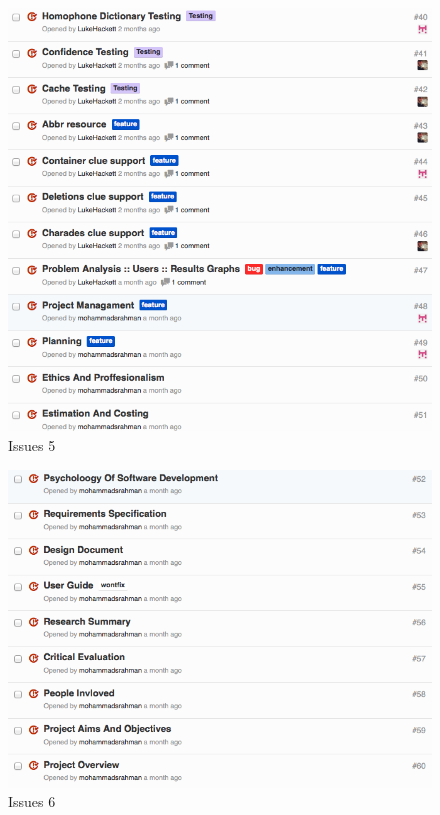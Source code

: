 \begin{figure}[H]
  \centering
  \includegraphics[width=\linewidth]{images/issues5.png}
  \caption{Issues 5}
  \label{fig:issues5}
\end{figure}
\begin{figure}[H]
  \centering
  \includegraphics[width=\linewidth]{images/issues6.png}
  \caption{Issues 6}
  \label{fig:issues6}
\end{figure}

